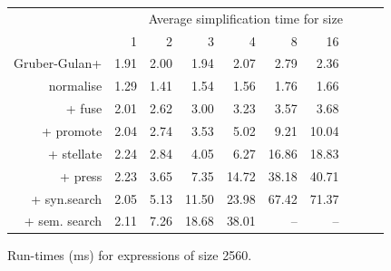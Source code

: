 \begin{figure}\begin{tabular}{rrrrrrrrrr}
 & \multicolumn{9}{c}{Average simplification time for size} \\
 & 1 & 2 & 3 & 4 & 8 & 16 \\
Gruber-Gulan+ & 1.91 & 2.00 & 1.94 & 2.07 & 2.79 & 2.36 \\
normalise & 1.29 & 1.41 & 1.54 & 1.56 & 1.76 & 1.66 \\
+ fuse & 2.01 & 2.62 & 3.00 & 3.23 & 3.57 & 3.68 \\
+ promote & 2.04 & 2.74 & 3.53 & 5.02 & 9.21 & 10.04 \\
+ stellate & 2.24 & 2.84 & 4.05 & 6.27 & 16.86 & 18.83 \\
+ press & 2.23 & 3.65 & 7.35 & 14.72 & 38.18 & 40.71 \\
+ syn.search & 2.05 & 5.13 & 11.50 & 23.98 & 67.42 & 71.37 \\
+ sem. search & 2.11 & 7.26 & 18.68 & 38.01 & -- & -- \\
\end{tabular}\caption{Run-times (ms) for expressions of size 2560.}\end{figure}
